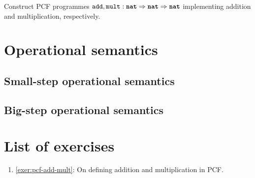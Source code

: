 \begin{exercise}\label{exer:pcf-add-mult}
  Construct PCF programmes
  \(\operatorname{\texttt{add}},\texttt{mult} : \texttt{\textbf{nat}} \Rightarrow \texttt{\textbf{nat}} \Rightarrow \texttt{\textbf{nat}}\)
  implementing addition and multiplication, respectively.
\end{exercise}

\section{Operational semantics}

\subsection{Small-step operational semantics}

\subsection{Big-step operational semantics}

\section{List of exercises}
\begin{enumerate}
\item \cref{exer:pcf-add-mult}: On defining addition and multiplication in PCF.
\end{enumerate}




